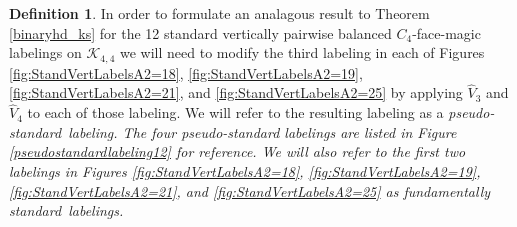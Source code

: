 \documentclass[10pt, reqno]{amsart}
\theoremstyle{definition}
\newtheorem{definition}{Definition}
\theoremstyle{plain}
\begin{document}
\begin{definition}
In order to formulate an analagous result to Theorem \ref{binaryhd_ks} for the 12 standard vertically pairwise balanced $C_4$-face-magic labelings 
on $\mathcal{K}_{4,4}$ we will need to modify the third labeling in each of Figures \ref{fig:StandVertLabelsA2=18}, \ref{fig:StandVertLabelsA2=19}, 
\ref{fig:StandVertLabelsA2=21}, and \ref{fig:StandVertLabelsA2=25} by applying $\widehat{V}_3$ and $\widehat{V}_4$ to each of those labeling. We will refer 
to the resulting labeling as a \it{pseudo-standard}\rm\ labeling. The four pseudo-standard labelings are listed in Figure \ref{pseudostandardlabeling12} for
reference. We will also refer to the first two labelings in 
Figures \ref{fig:StandVertLabelsA2=18}, \ref{fig:StandVertLabelsA2=19}, 
\ref{fig:StandVertLabelsA2=21}, and \ref{fig:StandVertLabelsA2=25}
as \it{fundamentally standard}\rm\ labelings.  
\end{definition}
\end{document}
